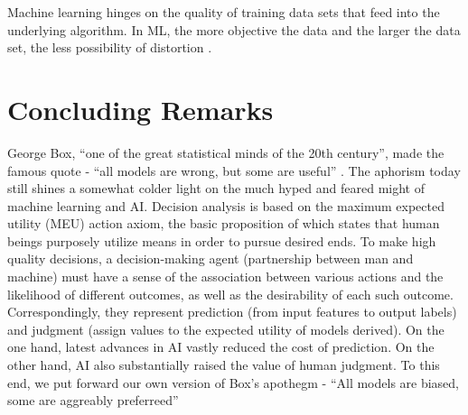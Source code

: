 \documentclass[deca,nonblindrev]{informs3} %
\begin{document}
Machine learning hinges  on the quality of training data sets that feed into the underlying algorithm.  In ML,  the more objective the data and the larger the data set, the less possibility of distortion \citep{Rosso2015}.

\section {Concluding Remarks}

George Box, ``one of the great statistical minds of the 20th century'',  made the famous quote - ``all models are wrong, but some are useful'' \citep[p. 424]{box1987empirical}.  The aphorism today still shines a somewhat colder light on the much hyped and feared might of machine learning and AI. Decision analysis is  based on the maximum expected utility (MEU) action axiom, the basic proposition of which states that  human beings purposely utilize means in order to pursue  desired ends. To make high quality decisions, a decision-making agent (partnership between man and machine)  must have a sense of the association between various actions and the likelihood of different outcomes, as well as the desirability of each such outcome. Correspondingly, they represent prediction (from input features to output labels) and judgment (assign values to the expected utility of models derived). On the one hand,  latest advances in AI vastly  reduced the cost of prediction. On the other hand, AI also substantially raised the value of human judgment. To this end, we put forward our own version of Box's apothegm -    ``All models are biased, some are aggreably  preferreed''


\ACKNOWLEDGMENT{%
}%


%
%
%
\newpage
\end{document}
